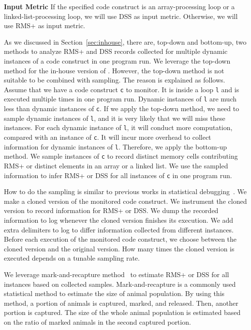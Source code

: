 \noindent\textbf{Input Metric}
If the specified code construct is an array-processing loop 
or a linked-list-processing loop,
we will use DSS as input metric. 
Otherwise, we will use RMS+ as input metric. 

As we discussed in Section~\ref{sec:inhouse}, 
there are, top-down and bottom-up, 
two methods to analyze RMS+ and DSS records collected 
for multiple dynamic instances of a code construct in one program run. 
We leverage the top-down method for the in-house version of \Tool. 
However, the top-down method is not suitable to be combined with sampling. 
The reason is explained as follows.
Assume that we have a code construct \texttt{c} to monitor. 
It is inside a loop \texttt{l} and is executed multiple times in one program run.
Dynamic instances of \texttt{l} are much less than 
dynamic instances of \texttt{c}.
If we apply the top-down method, 
we need to sample dynamic instances of \texttt{l}, 
and it is very likely that we will miss these instances. 
For each dynamic instance of \texttt{l}, 
it will conduct more computation, 
compared with an instance of \texttt{c}.
It will incur more overhead to collect 
information for dynamic instances of \texttt{l}.
Therefore, we apply the bottom-up method.
We sample instances of \texttt{c} to record 
distinct memory cells contributing RMS+ 
or distinct elements in an array or a linked list.
We use the sampled information to infer RMS+ 
or DSS for all instances of \texttt{c} in one program run.

How to do the sampling is similar to previous works in statistical 
debugging~\cite{liblit03,liblit05,CCI,SongOOPSLA2014,ldoctor}.
We make a cloned version of the monitored code construct.
We instrument the cloned version to record information for RMS+ or DSS. 
We dump the recorded information to log 
whenever the cloned version finishes its execution. 
We add extra delimiters to log to differ information collected from different instances.
Before each execution of the monitored code construct, 
we choose between the cloned version and the original version. 
How many times the cloned version is executed 
depends on a tunable sampling rate. 

We leverage mark-and-recapture method~\citep{mark-recapture} to 
estimate RMS+ or DSS for all instances based on collected samples. 
Mark-and-recapture is a commonly used statistical method 
to estimate the size of animal population. 
By using this method, a portion of animals is captured, marked, and released. 
Then, another portion is captured.
The size of the whole animal population is estimated 
based on the ratio of marked animals in the second captured portion.  

